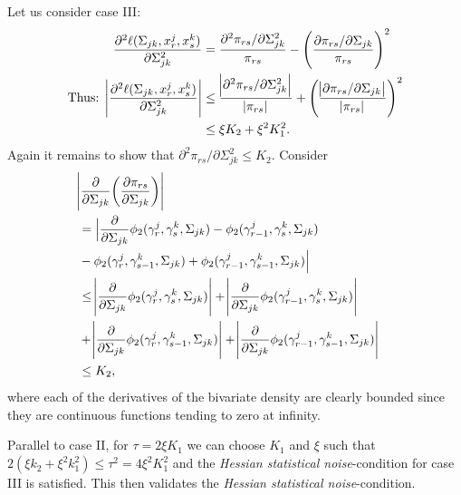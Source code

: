 \begin{condition}
    Let us consider case III:
    \begin{equation}\label{hessian_case3}
        \begin{split}
            \frac{\partial^2 \ell(\Sigma_{jk}, x^j_r,x^k_s)}{\partial \Sigma_{jk}^{2}} &= \frac{\partial^2 \pi_{rs}/\partial \Sigma_{jk}^{2}}{\pi_{rs}} - \Bigg(\frac{\partial \pi_{rs}/\partial \Sigma_{jk}}{\pi_{rs}}\Bigg)^2 \\
            \text{Thus: } \abs{\frac{\partial^2 \ell(\Sigma_{jk}, x^j_r,x^k_s)}{\partial \Sigma_{jk}^{2}}} &\leq \frac{\abs{\partial^2 \pi_{rs}/\partial \Sigma_{jk}^{2}}}{\abs{\pi_{rs}}} + \Bigg(\frac{\abs{\partial \pi_{rs}/\partial \Sigma_{jk}}}{\abs{\pi_{rs}}} \Bigg)^2 \\ 
            &\leq \xi K_2 + \xi^2K_1^2.
        \end{split}
    \end{equation}
    Again it remains to show that $\partial^2 \pi_{rs}/\partial \Sigma_{jk}^{2} \leq K_2$. Consider
    \begin{equation*}
        \begin{split}
        \lefteqn{\abs{\frac{\partial}{\partial \Sigma_{jk}}\bigg(\frac{\partial \pi_{rs}}{\partial \Sigma_{jk}}\bigg)}} \\
        &= \Big\lvert \frac{\partial}{\partial \Sigma_{jk}}\phi_2({\gamma}^j_r, {\gamma}^k_s, \Sigma_{jk}) - \phi_2({\gamma}^j_{r-1}, {\gamma}^k_s, \Sigma_{jk}) \\
        &- \phi_2({\gamma}^j_r, {\gamma}^k_{s-1}, \Sigma_{jk}) + \phi_2({\gamma}^j_{r-1}, {\gamma}^k_{s-1}, \Sigma_{jk})\Big\rvert \\
        &\leq \abs{\frac{\partial}{\partial \Sigma_{jk}}\phi_2({\gamma}^j_r, {\gamma}^k_s, \Sigma_{jk})} + \abs{\frac{\partial}{\partial \Sigma_{jk}}\phi_2({\gamma}^j_{r-1}, {\gamma}^k_s, \Sigma_{jk})} \\
        &+ \abs{\frac{\partial}{\partial \Sigma_{jk}}\phi_2({\gamma}^j_r, {\gamma}^k_{s-1}, \Sigma_{jk})} + \abs{\frac{\partial}{\partial \Sigma_{jk}}\phi_2({\gamma}^j_{r-1}, {\gamma}^k_{s-1}, \Sigma_{jk})} \\
        &\leq K_2,
        \end{split}
    \end{equation*}
    where each of the derivatives of the bivariate density are clearly bounded since they are continuous functions tending to zero at infinity.
    
    Parallel to case II, for $\tau = 2\xi K_1$ we can choose $K_1$ and $\xi$ such that $2(\xi k_2 + \xi^2 k_1^2) \leq \tau^2 = 4\xi^2 K_1^2$ and the \textit{Hessian statistical noise}-condition for case III is satisfied. This then validates the \textit{Hessian statistical noise}-condition. 
\end{condition} 

